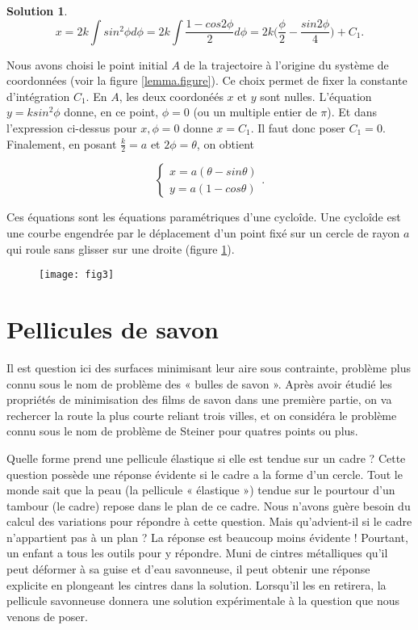 \documentclass[10pt,a4paper]{article}%
\theoremstyle{theorem}
\theoremstyle{definition}
\newtheorem*{solution*}{Solution}
\begin{document}
\begin{solution*}
		\[x=2k\int sin^2\phi d\phi =2k\int\frac{1-cos2\phi}{2}d\phi=2k\big(\frac{\phi}{2}-\frac{sin2\phi}{4}\big)+C_1.\]
		
		Nous avons choisi le point initial $A$ de la trajectoire à l'origine du système de coordonnées (voir la figure \ref{lemma.figure}). Ce choix permet de fixer la constante d'intégration $C_1$. En $A$, les deux coordonéés $x$ et $y$ sont nulles. L'équation $y=ksin^2\phi$ donne, en ce point, $\phi=0$ (ou un multiple entier de $\pi$). Et dans l'expression ci-dessus pour $x, \phi=0$ donne $x=C_1$. Il faut donc poser $C_1=0$. Finalement, en posant $\frac{k}{2}=a$ et $2\phi=\theta$, on obtient 
		
		\begin{equation*}
			\begin{cases}
			x=a(\theta-sin\theta)
			\\
			y=a(1-cos\theta)
			\end{cases}.
		\end{equation*}
		
		Ces équations sont les équations paramétriques d'une cycloîde. Une cycloîde est une courbe engendrée par le déplacement d'un point fixé sur un cercle de rayon $a$ qui roule sans glisser sur une droite (figure \ref{cycloide.figure}).
		
		\begin{figure}[h]\label{cycloide.figure}
			\begin{center}
				\texttt{[image: fig3]}
			\end{center}
		\end{figure}
		
		
	\end{solution*}
		
	\section{Pellicules de savon}
	Il est question ici des surfaces minimisant leur aire sous contrainte, problème plus connu sous le nom de problème des « bulles de savon ». Après avoir étudié les propriétés de minimisation des films de savon dans une première partie, on va rechercer la route la plus courte reliant trois villes, et on considéra le problème connu sous le nom de problème de Steiner pour quatres points ou plus.
		
	Quelle forme prend une pellicule  élastique si elle est tendue sur un cadre ? Cette
	question possède une réponse  évidente si le cadre a la forme d’un cercle. Tout le monde
	sait que la peau (la pellicule « élastique ») tendue sur le pourtour d’un tambour (le cadre)
	repose dans le plan de ce cadre. Nous n’avons guère besoin du calcul des variations pour
	répondre à cette question. Mais qu’advient-il si le cadre n’appartient pas à un plan ?
	La réponse est beaucoup moins  évidente ! Pourtant, un enfant a tous les outils pour y
	répondre. Muni de cintres métalliques qu’il peut déformer à sa guise et d’eau savonneuse,
	il peut obtenir une réponse explicite en plongeant les cintres dans la solution. Lorsqu’il
	les en retirera, la pellicule savonneuse donnera une solution expérimentale à la question
	que nous venons de poser.
		
\end{document}
